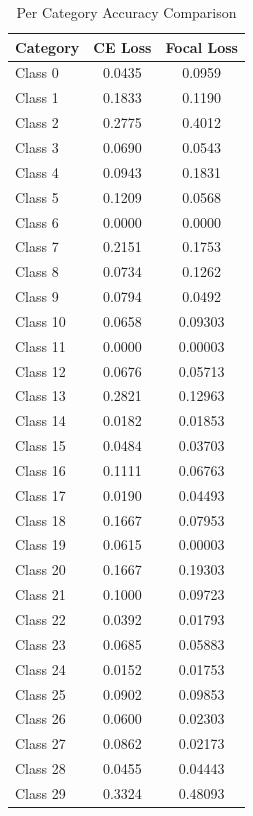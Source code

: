 \documentclass[10pt,twocolumn,letterpaper]{article}
\begin{document}
\begin{table}
\begin{center}
\begin{tabular}{|l|c|c|}
\hline
Category & CE Loss & Focal Loss \\
\hline\hline
Class 0 & 0.0435 & 0.0959 \\
Class 1 & 0.1833 & 0.1190 \\
Class 2 & 0.2775 & 0.4012 \\
Class 3 & 0.0690 & 0.0543 \\
Class 4 & 0.0943 & 0.1831 \\
Class 5 & 0.1209 & 0.0568 \\
Class 6 & 0.0000 & 0.0000 \\
Class 7 & 0.2151 & 0.1753 \\
Class 8 & 0.0734 & 0.1262 \\
Class 9 & 0.0794 & 0.0492 \\
Class 10 & 0.0658 & 0.09303 \\
Class 11 & 0.0000 & 0.00003 \\
Class 12 & 0.0676 & 0.05713 \\
Class 13 & 0.2821 & 0.12963 \\
Class 14 & 0.0182 & 0.01853 \\
Class 15 & 0.0484 & 0.03703 \\
Class 16 & 0.1111 & 0.06763 \\
Class 17 & 0.0190 & 0.04493 \\
Class 18 & 0.1667 & 0.07953 \\
Class 19 & 0.0615 & 0.00003 \\
Class 20 & 0.1667 & 0.19303 \\
Class 21 & 0.1000 & 0.09723 \\
Class 22 & 0.0392 & 0.01793 \\
Class 23 & 0.0685 & 0.05883 \\
Class 24 & 0.0152 & 0.01753 \\
Class 25 & 0.0902 & 0.09853 \\
Class 26 & 0.0600 & 0.02303 \\
Class 27 & 0.0862 & 0.02173 \\
Class 28 & 0.0455 & 0.04443 \\
Class 29 & 0.3324 & 0.48093 \\
\hline
\end{tabular}
\end{center}
\caption{Per Category Accuracy Comparison}
\label{tab:per_category_accuracy}
\end{table}
\end{document}
